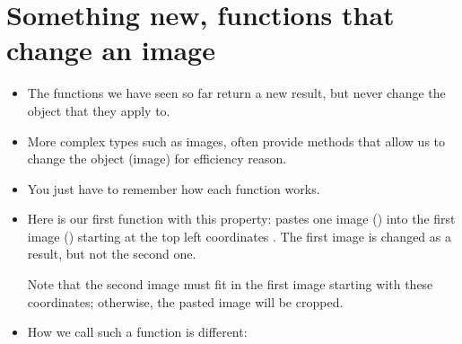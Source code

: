 \documentclass[letterpaper,10pt,english]{sphinxmanual}
\begin{document}
\section{Something new, functions that change an image}
\label{\detokenize{lecture_notes/lec07_modules_images:something-new-functions-that-change-an-image}}\begin{itemize}
\item {} 
The functions we have seen so far return a new result, but never
change the object that they apply to.

\item {} 
More complex types such as images, often provide methods that allow us to change the
object (image)
for efficiency reason.

\item {} 
You just have to remember how each function works.

\item {} 
Here is our first function with this property:  pastes one image () into the first image ()
starting at the top left coordinates . The first image is
changed as a result, but not the second one.

Note that the second image must fit in the first image starting
with these coordinates; otherwise, the pasted image will be cropped.

\item {} 
How we call such a function is different:

\begin{sphinxVerbatim}[commandchars=\\\{\}]
  
      
     
  
\end{sphinxVerbatim}


\end{itemize}
\end{document}
